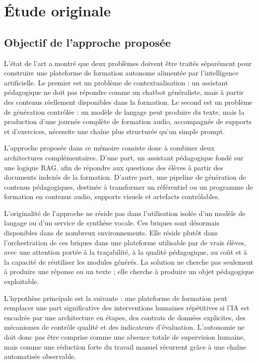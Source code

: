 \section{Étude originale}

\subsection{Objectif de l'approche proposée}

L'état de l'art a montré que deux problèmes doivent être traités séparément pour
construire une plateforme de formation autonome alimentée par l'intelligence
artificielle. Le premier est un problème de contextualisation : un assistant pédagogique
ne doit pas répondre comme un chatbot généraliste, mais à partir des contenus réellement
disponibles dans la formation. Le second est un problème de génération contrôlée : un
modèle de langage peut produire du texte, mais la production d'une journée complète de
formation audio, accompagnée de supports et d'exercices, nécessite une chaîne plus
structurée qu'un simple prompt.

L'approche proposée dans ce mémoire consiste donc à combiner deux architectures
complémentaires. D'une part, un assistant pédagogique fondé sur une logique RAG, afin
de répondre aux questions des élèves à partir des documents indexés de la formation.
D'autre part, une pipeline de génération de contenus pédagogiques, destinée à transformer
un référentiel ou un programme de formation en contenus audio, supports visuels et
artefacts contrôlables.

L'originalité de l'approche ne réside pas dans l'utilisation isolée d'un modèle de langage
ou d'un service de synthèse vocale. Ces briques sont désormais disponibles dans de
nombreux environnements. Elle réside plutôt dans l'orchestration de ces briques dans une
plateforme utilisable par de vrais élèves, avec une attention portée à la traçabilité, à la
qualité pédagogique, au coût et à la capacité de réutiliser les modules générés. La solution
ne cherche pas seulement à produire une réponse ou un texte ; elle cherche à produire un
objet pédagogique exploitable.

L'hypothèse principale est la suivante : une plateforme de formation peut remplacer une
part significative des interventions humaines répétitives si l'IA est encadrée par une
architecture en étapes, des contrats de données explicites, des mécanismes de contrôle
qualité et des indicateurs d'évaluation. L'autonomie ne doit donc pas être comprise comme
une absence totale de supervision humaine, mais comme une réduction forte du travail
manuel récurrent grâce à une chaîne automatisée observable.


